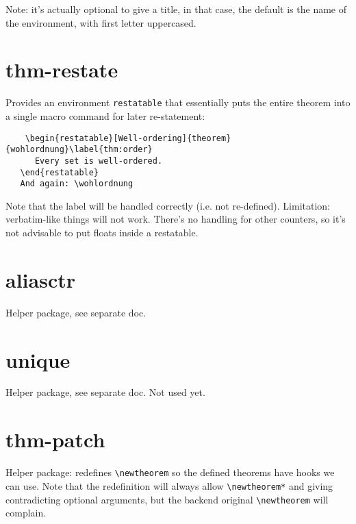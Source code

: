 \documentclass[a4paper, abstracton]{scrartcl}
\begin{document}
  Note: it's actually optional to give a title, in that case, the default is
  the name of the environment, with first letter uppercased.
  
  \section{thm-restate}
  
  Provides an environment \verb|restatable| that essentially puts the entire
  theorem into a single macro command for later re-statement:
  \begin{verbatim}
    \begin{restatable}[Well-ordering]{theorem}{wohlordnung}\label{thm:order}
      Every set is well-ordered.
   \end{restatable}
   And again: \wohlordnung
  \end{verbatim}
  Note that the label will be handled correctly (i.e. not re-defined).
  Limitation: verbatim-like things will not work. There's no handling for
  other counters, so it's not advisable to put floats inside a restatable.

  \section{aliasctr}
  
  Helper package, see separate doc.
  
  \section{unique}
  
  Helper package, see separate doc. Not used yet.
  
  \section{thm-patch}
  Helper package: redefines \verb|\newtheorem| so the defined theorems have
  hooks we can use. Note that the redefinition will always allow
  \verb|\newtheorem*| and giving contradicting optional arguments, but the
  backend original \verb|\newtheorem| will complain.
\end{document}
